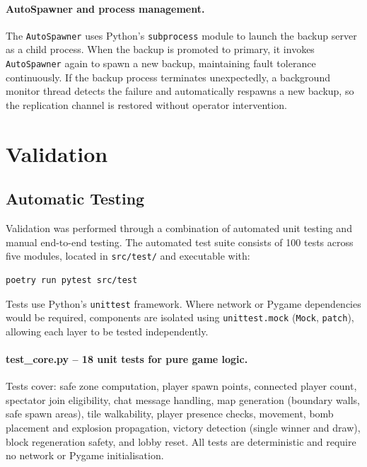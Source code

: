 \documentclass{scrartcl}
\begin{document}
\paragraph{AutoSpawner and process management.}
The \texttt{AutoSpawner} uses Python's \texttt{subprocess} module to launch the backup server as a child process.
When the backup is promoted to primary, it invokes \texttt{AutoSpawner} again to spawn a new backup, maintaining fault tolerance continuously.
If the backup process terminates unexpectedly, a background monitor thread detects the failure and automatically respawns a new backup, so the replication channel is restored without operator intervention.


\section{Validation}\label{validation}

\subsection{Automatic Testing}\label{automatic-testing}

Validation was performed through a combination of automated unit testing and manual end-to-end testing.
The automated test suite consists of 100 tests across five modules, located in \texttt{src/test/} and executable with:
\begin{lstlisting}
poetry run pytest src/test
\end{lstlisting}
Tests use Python's \texttt{unittest} framework. Where network or Pygame dependencies would be required, components are isolated using \texttt{unittest.mock} (\texttt{Mock}, \texttt{patch}), allowing each layer to be tested independently.

\paragraph{test\_core.py -- 18 unit tests for pure game logic.}
Tests cover: safe zone computation, player spawn points, connected player count, spectator join eligibility, chat message handling, map generation (boundary walls, safe spawn areas), tile walkability, player presence checks, movement, bomb placement and explosion propagation, victory detection (single winner and draw), block regeneration safety, and lobby reset.
All tests are deterministic and require no network or Pygame initialisation.
\end{document}
